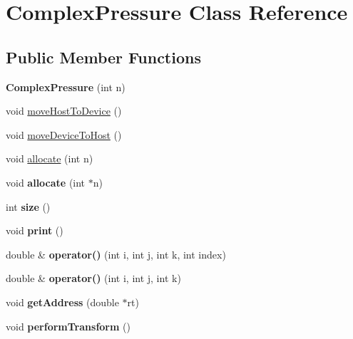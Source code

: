 \hypertarget{classComplexPressure}{}\section{Complex\+Pressure Class Reference}
\label{classComplexPressure}
\subsection*{Public Member Functions}
\begin{DoxyCompactItemize}
\item 
\mbox{\label{classComplexPressure_a345b5fa268a6e332dee9560c0d49b4f6}} 
{\bfseries Complex\+Pressure} (int n)
\item 
void \mbox{\hyperlink{classComplexPressure_a5876b6724709161a177280dccc297133}{move\+Host\+To\+Device}} ()
\item 
void \mbox{\hyperlink{classComplexPressure_ae2729ea6cdbaf77fd6fa06d0c449dd64}{move\+Device\+To\+Host}} ()
\item 
void \mbox{\hyperlink{classComplexPressure_ae878fcf30de5aa4a3c3bf5e3b6e811c4}{allocate}} (int n)
\item 
\mbox{\label{classComplexPressure_a3ed5bc7ea45b1c35a38a4a9068e619e6}} 
void {\bfseries allocate} (int $\ast$n)
\item 
\mbox{\label{classComplexPressure_a765d0014a27497f491f985580c3142f8}} 
int {\bfseries size} ()
\item 
\mbox{\label{classComplexPressure_a442fd0a155fe9a4084c2657ddd36a3d3}} 
void {\bfseries print} ()
\item 
\mbox{\label{classComplexPressure_afe220a34f9d5472272ec505167467640}} 
double \& {\bfseries operator()} (int i, int j, int k, int index)
\item 
\mbox{\label{classComplexPressure_ab2ffe4c0382b0b4e85e66edabc47f891}} 
double \& {\bfseries operator()} (int i, int j, int k)
\item 
\mbox{\label{classComplexPressure_aa64da363daa56b64d9fc572c9d6b5815}} 
void {\bfseries get\+Address} (double $\ast$rt)
\item 
\mbox{\label{classComplexPressure_a261970012ce5a4fe0e1706c7007dbfd6}} 
void {\bfseries perform\+Transform} ()
\end{DoxyCompactItemize}
